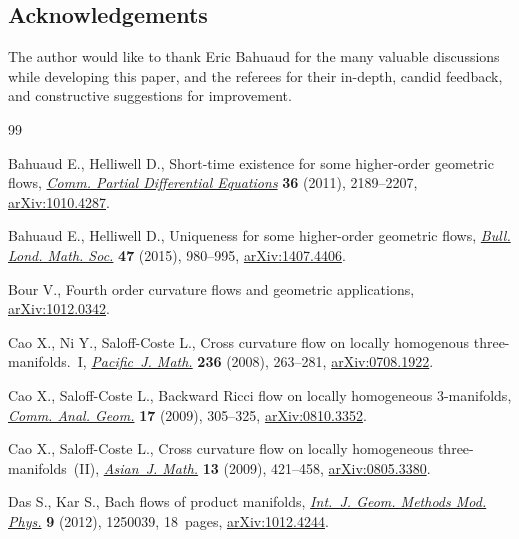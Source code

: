 \documentclass[10pt,a4paper]{amsart}
\numberwithin{equation}{section}
\begin{document}
\subsection*{Acknowledgements}

The author would like to thank Eric Bahuaud for the many valuable discussions while developing this paper, and the referees for their in-depth, candid feedback, and constructive suggestions for improvement.


\begin{thebibliography}{99}
\footnotesize\itemsep=0pt

Bahuaud E., Helliwell D., Short-time existence for some higher-order geometric
 flows, \href{https://doi.org/10.1080/03605302.2011.593015}{\textit{Comm. Partial Differential Equations}} \textbf{36} (2011), 2189--2207, \href{https://arxiv.org/abs/1010.4287}{arXiv:1010.4287}.

Bahuaud E., Helliwell D., Uniqueness for some higher-order geometric flows,
 \href{https://doi.org/10.1112/blms/bdv076}{\textit{Bull. Lond. Math. Soc.}} \textbf{47} (2015), 980--995,
 \href{https://arxiv.org/abs/1407.4406}{arXiv:1407.4406}.

Bour V., Fourth order curvature flows and geometric applications,
 \href{https://arxiv.org/abs/1012.0342}{arXiv:1012.0342}.

Cao X., Ni Y., Saloff-Coste L., Cross curvature flow on locally homogenous
 three-manifolds.~{I}, \href{https://doi.org/10.2140/pjm.2008.236.263}{\textit{Pacific~J. Math.}} \textbf{236} (2008),
 263--281, \href{https://arxiv.org/abs/0708.1922}{arXiv:0708.1922}.

Cao X., Saloff-Coste L., Backward {R}icci flow on locally homogeneous
 3-manifolds, \href{https://doi.org/10.4310/CAG.2009.v17.n2.a6}{\textit{Comm. Anal. Geom.}} \textbf{17} (2009), 305--325, \href{https://arxiv.org/abs/0810.3352}{arXiv:0810.3352}.

Cao X., Saloff-Coste L., Cross curvature flow on locally homogeneous
 three-manifolds~({II}), \href{https://doi.org/10.4310/AJM.2009.v13.n4.a1}{\textit{Asian~J. Math.}} \textbf{13} (2009), 421--458,
 \href{https://arxiv.org/abs/0805.3380}{arXiv:0805.3380}.

Das S., Kar S., Bach flows of product manifolds, \href{https://doi.org/10.1142/S0219887812500399}{\textit{Int.~J. Geom. Methods
 Mod. Phys.}} \textbf{9} (2012), 1250039, 18~pages, \href{https://arxiv.org/abs/1012.4244}{arXiv:1012.4244}.


\end{thebibliography}
\end{document}
